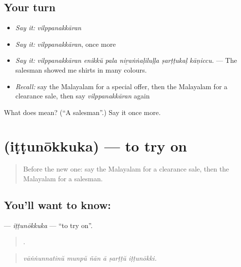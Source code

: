 \subsection*{Your turn}
\begin{itemize}
\raggedright
  \item \emph{Say it:} \emph{vilppanakkāran}
  \item \emph{Say it:} \emph{vilppanakkāran}, once more
  \item \emph{Say it:} \emph{vilppanakkāran enikkŭ pala niṟaṅṅaḷiluḷḷa ṣarṭṭukaḷ kāṇiccu.} — The salesman showed me shirts in many colours.
  \item \emph{Recall:} say the Malayalam for a special offer, then the Malayalam for a clearance sale, then say \emph{vilppanakkāran} again
\end{itemize}

\begin{tcolorbox}[breakable,colback=teal!4,colframe=teal!35!black,title={Before you move on}]
What does  mean? (\textquotedblleft{}A salesman\textquotedblright{}.) Say it once more.
\end{tcolorbox}
\section[\texorpdfstring{\ml{ഇട്ടുനോക്കുക} (iṭṭunōkkuka)}{ഇട്ടുനോക്കുക (iṭṭunōkkuka)}]{ (iṭṭunōkkuka) — to try on}

\label{lesson:ML-C491-ittunokkuka}



\begin{quote}
Before the new one: say the Malayalam for a clearance sale, then the Malayalam for a salesman.
\end{quote}

\subsection*{You'll want to know: }
\textbf{} — \emph{iṭṭunōkkuka} — \textquotedblleft{}to try on\textquotedblright{}.

\begin{quote}
     .
\end{quote}

\begin{quote}
\emph{vāṅṅunnatinŭ munpŭ ñān ā ṣarṭṭŭ iṭṭunōkki.}
\end{quote}

